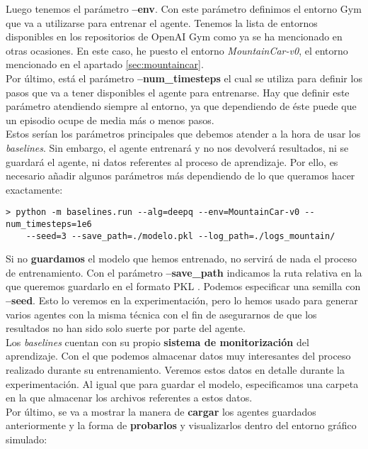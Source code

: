 \documentclass[11pt,fleqn]{book} %
\begin{document}
Luego tenemos el parámetro \textbf{--env}. Con este parámetro definimos el entorno Gym que va a utilizarse para entrenar el agente. Tenemos la lista de entornos disponibles en los repositorios de OpenAI Gym como ya se ha mencionado en otras ocasiones. En este caso, he puesto el entorno \textit{MountainCar-v0}, el entorno mencionado en el apartado \ref{sec:mountaincar}. \\

Por último, está el parámetro \textbf{--num\_timesteps} el cual se utiliza para definir los pasos que va a tener disponibles el agente para entrenarse. Hay que definir este parámetro atendiendo siempre al entorno, ya que dependiendo de éste puede que un episodio ocupe de media más o menos pasos. \\

Estos serían los parámetros principales que debemos atender a la hora de usar los \textit{baselines}. Sin embargo, el agente entrenará y no nos devolverá resultados, ni se guardará el agente, ni datos referentes al proceso de aprendizaje. Por ello, es necesario añadir algunos parámetros más dependiendo de lo que queramos hacer exactamente:

\begin{verbatim}
> python -m baselines.run --alg=deepq --env=MountainCar-v0 --num_timesteps=1e6
    --seed=3 --save_path=./modelo.pkl --log_path=./logs_mountain/
\end{verbatim}

Si no \textbf{guardamos} el modelo que hemos entrenado, no servirá de nada el proceso de entrenamiento. Con el parámetro \textbf{--save\_path} indicamos la ruta relativa en la que queremos guardarlo en el formato PKL \cite{article:pkl}. Podemos especificar una semilla con \textbf{--seed}. Esto lo veremos en la experimentación, pero lo hemos usado para generar varios agentes con la misma técnica con el fin de asegurarnos de que los resultados no han sido solo suerte por parte del agente. \\

Los \textit{baselines} cuentan con su propio \textbf{sistema de monitorización} del aprendizaje. Con el que podemos almacenar datos muy interesantes del proceso realizado durante su entrenamiento. Veremos estos datos en detalle durante la experimentación. Al igual que para guardar el modelo, especificamos una carpeta en la que almacenar los archivos referentes a estos datos. \\

Por último, se va a mostrar la manera de \textbf{cargar} los agentes guardados anteriormente y la forma de \textbf{probarlos} y visualizarlos dentro del entorno gráfico simulado:
\end{document}
